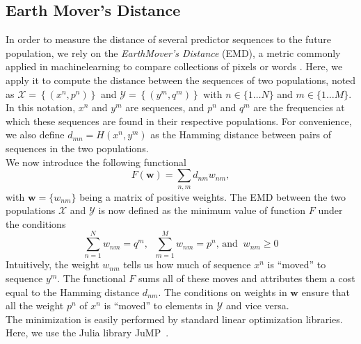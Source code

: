 \documentclass[reprint,amsmath,amssymb,superscriptaddress,showpacs,pre]{revtex4-1}
\begin{document}
\subsection*{Earth Mover's Distance} %
\label{sub:earth_mover_s_distance}

	In order to measure the distance of several predictor sequences to the future population, we rely on the \emph{EarthMover's Distance} (EMD), a metric commonly applied in machinelearning to compare collections of pixels or words \cite{710701,10.5555/3045118.3045221}. Here, we apply it to compute the distance between the sequences of two populations, noted as $\mathcal{X} = \left\{(x^n, p^n)\right\}$ and $\mathcal{Y}=\left\{(y^m,q^m)\right\}$ with $n\in\{1\ldots N\}$ and $m\in\{1\ldots M\}$. In this notation, $x^n$ and $y^m$ are sequences, and $p^n$ and $q^m$ are the frequencies at which these sequences are found in their respective populations. For convenience, we also define $d_{mn} = H(x^n,y^m)$ as the Hamming distance between pairs of sequences in the two populations. \\
	We now introduce the following functional
	$$ F(\mathbf{w}) = \sum_{n,m} d_{nm}w_{nm}, $$
	with $\mathbf{w} = \{w_{nm}\}$ being a matrix of positive weights. The EMD between the two populations $\mathcal{X}$ and $\mathcal{Y}$ is now defined as the minimum value of function $F$ under the conditions 
	\begin{equation*}
			\sum_{n=1}^N w_{nm} = q^m,\;\; \sum_{m=1}^M w_{nm} = p^n, \,\text{and}\;\; w_{nm}\geq 0
	\end{equation*}
	Intuitively, the weight $w_{nm}$ tells us how much of sequence $x^n$ is ``moved'' to sequence $y^m$. The functional $F$ sums all of these moves and attributes them a cost equal to the Hamming distance $d_{nm}$. The conditions on weights in $\mathbf{w}$ ensure that all the weight $p^n$ of $x^n$ is ``moved'' to elements in $\mathcal{Y}$ and vice versa. \\
	The minimization is easily performed by standard linear optimization libraries. Here, we use the Julia library {JuMP}~\cite{DunningHuchetteLubin2017}.





\newpage 
\appendix
\setcounter{figure}{0}
\renewcommand{\figurename}{Figure S}
\setcounter{table}{0}
\renewcommand{\tablename}{Table S}
\onecolumngrid
\end{document}
